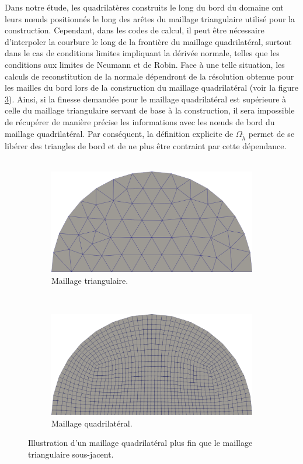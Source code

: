Dans notre étude, les quadrilatères construits le long du bord du domaine ont leurs nœuds positionnés le long des arêtes du maillage triangulaire utilisé pour la construction. Cependant, dans les codes de calcul, il peut être nécessaire d'interpoler la courbure le long de la frontière du maillage quadrilatéral, surtout dans le cas de conditions limites impliquant la dérivée normale, telles que les conditions aux limites de Neumann et de Robin. Face à une telle situation, les calculs de reconstitution de la normale dépendront de la résolution obtenue pour les mailles du bord lors de la construction du maillage quadrilatéral (voir la figure \ref{fig:mail_tri_vs_mail_quad}). Ainsi, si la finesse demandée pour le maillage quadrilatéral est supérieure à celle du maillage triangulaire servant de base à la construction, il sera impossible de récupérer de manière précise les informations avec les nœuds de bord du maillage quadrilatéral. Par conséquent, la définition explicite de $\Omega_{\tilde{h}}$ permet de se libérer des triangles de bord et de ne plus être contraint par cette dépendance.\\\\
\begin{figure}[h!]
\centering
\begin{subfigure}{0.65\textwidth}
    \includegraphics[width=\textwidth]{images/non_hermite_mesh_tri.pdf}
    \caption{Maillage triangulaire.}
    \label{fig:mail_tri_vs_mail_quad_1}
\end{subfigure}
\\[0.5cm]
\begin{subfigure}{0.65\textwidth}
    \includegraphics[width=\textwidth]{images/non_hermite_quad.pdf}
    \caption{Maillage quadrilatéral.}
    \label{fig:mail_tri_vs_mail_quad_2}
\end{subfigure}
\caption{Illustration d'un maillage quadrilatéral plus fin que le maillage triangulaire sous-jacent.}
\label{fig:mail_tri_vs_mail_quad}
\end{figure}
